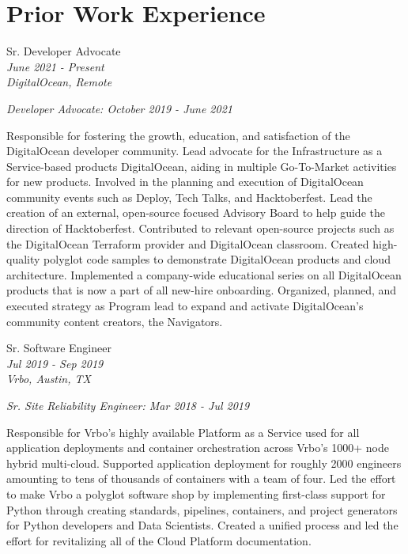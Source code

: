 \documentclass[10pt]{article} %
\begin{document}
\begin{minipage}[t]{0.5\textwidth} %
\vspace{0pt} %
\section{Prior Work Experience} 

{\raggedright\large Sr. Developer Advocate\\
\small \textit{June 2021 - Present}\\
\small \textit{DigitalOcean, Remote} \\
\raggedright\small \textit{Developer Advocate: October 2019 - June 2021}\\[5pt]}

\normalsize{
    Responsible for fostering the growth, education, and satisfaction of the DigitalOcean developer community. Lead advocate for the Infrastructure as a Service-based products DigitalOcean, aiding in multiple Go-To-Market activities for new products. Involved in the planning and execution of DigitalOcean community events such as Deploy, Tech Talks, and Hacktoberfest. Lead the creation of an external, open-source focused Advisory Board to help guide the direction of Hacktoberfest. Contributed to relevant open-source projects such as the DigitalOcean Terraform provider and DigitalOcean classroom. Created high-quality polyglot code samples to demonstrate DigitalOcean products and cloud architecture. Implemented a company-wide educational series on all DigitalOcean products that is now a part of all new-hire onboarding. Organized, planned, and executed strategy as Program lead to expand and activate DigitalOcean's community content creators, the Navigators. \\
}

{\raggedright\large Sr. Software Engineer\\
\small \textit{Jul 2019 - Sep 2019}\\
\small \textit{Vrbo, Austin, TX} \\
\raggedright\small \textit{Sr. Site Reliability Engineer: Mar 2018 - Jul 2019}\\[5pt]}

\normalsize{Responsible for Vrbo's highly available Platform as a Service used for all application deployments and container orchestration across Vrbo's 1000+ node hybrid multi-cloud. Supported application deployment for roughly 2000 engineers amounting to tens of thousands of containers with a team of four. Led the effort to make Vrbo a polyglot software shop by implementing first-class support for Python through creating standards, pipelines, containers, and project generators for Python developers and Data Scientists. Created a unified process and led the effort for revitalizing all of the Cloud Platform documentation. }\\


\end{minipage}
\end{document}
